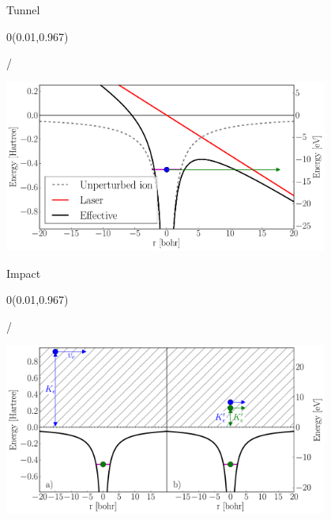 \documentclass{beamer}
\makeatletter
\newcommand{\framenumber}{
\begin{textblock}{0}(0.01,0.967)
\begin{scriptsize}
{\color{gray}\insertframenumber/\inserttotalframenumber}
\end{scriptsize}
\end{textblock}
}
\makeatother
\begin{document}
\begin{frame}{Tunnel}\framenumber
\begin{center}
\includegraphics[width=0.8\textwidth]{../figures/ionization_tunnel}
\end{center}
\end{frame}
\begin{frame}{Impact}\framenumber
\begin{center}
\includegraphics[width=0.8\textwidth]{../figures/ionization_impact}
\end{center}
\end{frame}

\end{document}
